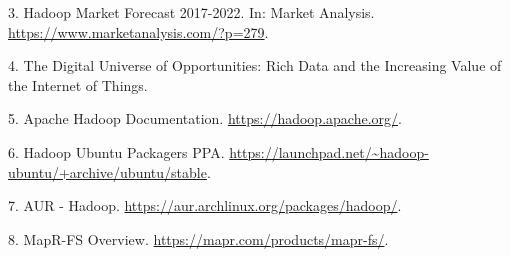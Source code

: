 \documentclass[italian,a4paper, twoside, 12pt]{report}
\begin{document}
\hypertarget{ref-hadoop-market-analysis}{}
3. Hadoop Market Forecast 2017-2022. In: Market Analysis.
\url{https://www.marketanalysis.com/?p=279}.

\hypertarget{ref-digital-univ}{}
4. The Digital Universe of Opportunities: Rich Data and the Increasing
Value of the Internet of Things.

\hypertarget{ref-hadoop-doc-main}{}
5. Apache Hadoop Documentation. \url{https://hadoop.apache.org/}.

\hypertarget{ref-hadoop-ppa}{}
6. Hadoop Ubuntu Packagers PPA.
\url{https://launchpad.net/~hadoop-ubuntu/+archive/ubuntu/stable}.

\hypertarget{ref-hadoop-aur}{}
7. AUR - Hadoop. \url{https://aur.archlinux.org/packages/hadoop/}.

\hypertarget{ref-mapr-fs}{}
8. MapR-FS Overview. \url{https://mapr.com/products/mapr-fs/}.
\end{document}
